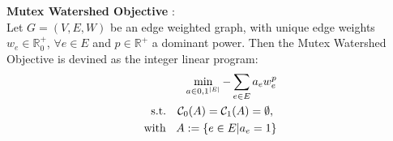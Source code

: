  \begin{defn}
 	\textbf{Mutex Watershed Objective} \cite{wolf2019mutex}: \\
 	Let $G = (V, E, W)$ be an edge weighted graph, with unique edge weights $w_e \in \mathbb{R}_0^+$, $\forall e \in E$ and $p \in \mathbb{R}^+$ a dominant power. Then the Mutex Watershed Objective is devined as the integer linear program:\\
 	\begin{align}
 		\min_{a\in {0,1}^{|E|}} - \sum_{e \in E} a_e w_e^p \\
		\text{s.t. \hspace{2mm}} \mathcal{C}_0(A) = \mathcal{C}_1(A) = \emptyset \text{, }\\
		\text{with \hspace{2mm}} A := \{ e \in E|a_e = 1 \}
 	\end{align}
 \end{defn}

